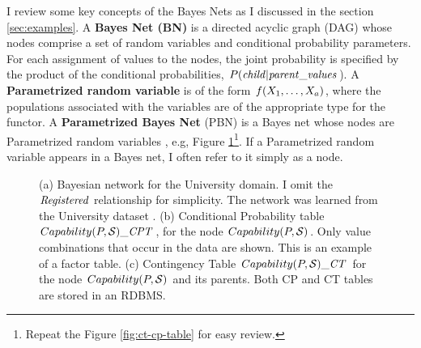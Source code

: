 \documentclass{sfuthesis}
\begin{document}
I review some key concepts of the Bayes Nets as I discussed in the %
section \ref{sec:examples}.
A {\bf Bayes Net (BN)} is a directed acyclic graph (DAG) whose nodes comprise a set of random variables and conditional probability parameters. For each assignment of values to the nodes, the joint probability is specified by the product of the conditional probabilities, $P(\it{child}|\it{parent\_values}$). A \textbf{Parametrized random variable} is of the form $\functor(\X_{1},\ldots,\X_{a})$, where the populations associated with the variables are of the appropriate type for the functor. A \textbf{Parametrized Bayes Net} (PBN) is a Bayes net whose nodes are Parametrized random variables \cite{Poole2003}, e.g, Figure \ref{fig:ct-cp-table1}\footnote{Repeat the Figure \ref{fig:ct-cp-table} for easy review.}. If a Parametrized random variable appears in a Bayes net, I  often refer to it simply as a node. 


\begin{figure}[!h]
 \centering
{} 
\caption{(a) Bayesian network for the University domain. I  omit the $\it{Registered}$ relationship for simplicity. The network was learned from the University dataset \cite{bib:bbsite}. (b) Conditional Probability table $Capability(\P,\S)\_\cptable$, for the node $Capability(\P,\S)$. Only value combinations that occur in the data are shown. This is an example of a factor table. (c) Contingency Table $Capability(\P,\S)\_\cttable$ for the node $Capability(\P,\S)$ and its parents. Both CP and CT tables are stored in an RDBMS.}
\label{fig:ct-cp-table1}
\end{figure}
\end{document}
